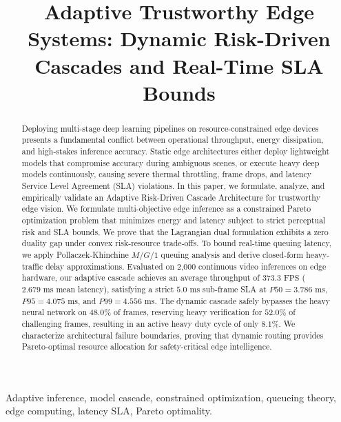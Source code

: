 \documentclass[conference]{IEEEtran}
\begin{document}
\title{Adaptive Trustworthy Edge Systems: Dynamic Risk-Driven Cascades and Real-Time SLA Bounds}

\author{
}

\maketitle

\begin{abstract}
Deploying multi-stage deep learning pipelines on resource-constrained edge devices presents a fundamental conflict between operational throughput, energy dissipation, and high-stakes inference accuracy. Static edge architectures either deploy lightweight models that compromise accuracy during ambiguous scenes, or execute heavy deep models continuously, causing severe thermal throttling, frame drops, and latency Service Level Agreement (SLA) violations. In this paper, we formulate, analyze, and empirically validate an Adaptive Risk-Driven Cascade Architecture for trustworthy edge vision. We formulate multi-objective edge inference as a constrained Pareto optimization problem that minimizes energy and latency subject to strict perceptual risk and SLA bounds. We prove that the Lagrangian dual formulation exhibits a zero duality gap under convex risk-resource trade-offs. To bound real-time queuing latency, we apply Pollaczek-Khinchine $M/G/1$ queuing analysis and derive closed-form heavy-traffic delay approximations. Evaluated on 2,000 continuous video inferences on edge hardware, our adaptive cascade achieves an average throughput of $373.3\text{ FPS}$ ($2.679\text{ ms}$ mean latency), satisfying a strict $5.0\text{ ms}$ sub-frame SLA at $P50 = 3.786\text{ ms}$, $P95 = 4.075\text{ ms}$, and $P99 = 4.556\text{ ms}$. The dynamic cascade safely bypasses the heavy neural network on $48.0\%$ of frames, reserving heavy verification for $52.0\%$ of challenging frames, resulting in an active heavy duty cycle of only $8.1\%$. We characterize architectural failure boundaries, proving that dynamic routing provides Pareto-optimal resource allocation for safety-critical edge intelligence.
\end{abstract}

\begin{IEEEkeywords}
Adaptive inference, model cascade, constrained optimization, queueing theory, edge computing, latency SLA, Pareto optimality.
\end{IEEEkeywords}
\end{document}
